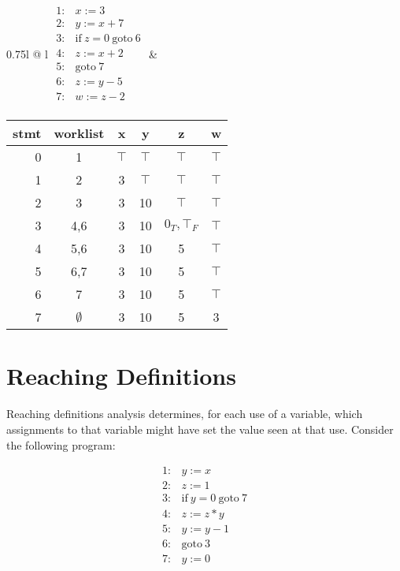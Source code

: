 \documentclass[11pt]{article}
\begin{document}
\begin{centering}
\begin{tabular*}{0.75\textwidth}{l @{\extracolsep{\fill}} l}
$
\begin{array}{ll}
1: & x := 3\\
2: & y := x + 7\\
3: & \mbox{if}~ z = 0 ~\mbox{goto}~ 6\\
4: & z := x + 2\\
5: & \mbox{goto}~ 7\\
6: & z := y - 5\\
7: & w := z - 2\\
\end{array}
$
&

\begin{tabular}{r | c | c c c c}

stmt & worklist & x & y & z & w \\
\hline
0  & 1   & $\top$ & $\top$ & $\top$ & $\top$ \\
1  & 2   & 3 & $\top$ & $\top$ & $\top$ \\
2  & 3   & 3 & 10 & $\top$ & $\top$ \\
3  & 4,6 & 3 & 10 & $0_T,\top_F$ & $\top$ \\
4  & 5,6 & 3 & 10 & 5 & $\top$ \\
5  & 6,7 & 3 & 10 & 5 & $\top$ \\
6  & 7   & 3 & 10 & 5 & $\top$ \\
7  & $\emptyset$   & 3 & 10 & 5 & 3 \\

\end{tabular}

\end{tabular*}

\end{centering}




\section{Reaching Definitions}

Reaching definitions analysis determines, for each use of a variable, which assignments to that variable might have set the value seen at that use.  Consider the following program:

\[
\begin{array}{ll}
1: & y := x\\
2: & z := 1\\
3: & \mbox{if}~ y = 0 ~\mbox{goto}~ 7\\
4: & z := z * y\\
5: & y := y - 1\\
6: & \mbox{goto}~ 3\\
7: & y := 0\\
\end{array}
\]
\end{document}
